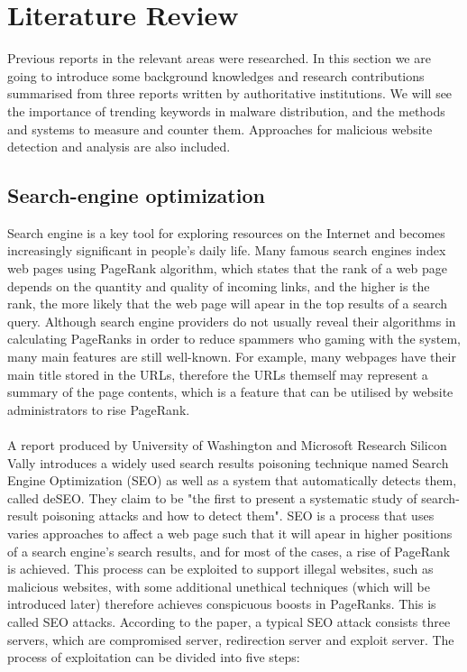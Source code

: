 \section{Literature Review}

Previous reports in the relevant areas were researched. In this section we are
going to introduce some background knowledges and research contributions
summarised from three reports written by authoritative institutions. We will
see the importance of trending keywords in malware distribution, and the
methods and systems to measure and counter them. Approaches for malicious
website detection and analysis are also included. 

\subsection{Search-engine optimization} 

Search engine is a key tool for
exploring resources on the Internet and becomes increasingly significant in
people's daily life. Many famous search engines index web pages using PageRank
algorithm, which states that the rank of a web page depends on the quantity and
quality of incoming links, and the higher is the rank, the more likely that the
web page will apear in the top results of a search query. Although search
engine providers do not usually reveal their algorithms in calculating
PageRanks in order to reduce spammers who gaming with the system, many main
features are still well-known. For example, many webpages have their main title
stored in the URLs, therefore the URLs themself may represent a summary of the
page contents, which is a feature that can be utilised by website administrators 
to rise PageRank.
\paragraph{}
A report produced by University of Washington and Microsoft
Research Silicon Vally introduces a widely used search results poisoning
technique named Search Engine Optimization (SEO) as well as a system that
automatically detects them, called deSEO.\cite{deseo} They claim to be "the
first to present a systematic study of search-result poisoning attacks and how
to detect them". SEO is a process that uses varies approaches to affect a web
page such that it will apear in higher positions of a search engine's search
results, and for most of the cases, a rise of PageRank is achieved. This
process can be exploited to support illegal websites, such as malicious
websites, with some additional unethical techniques (which will be introduced
later) therefore achieves conspicuous boosts in PageRanks. This is called SEO
attacks. According to the paper, a typical SEO attack consists three servers,
which are compromised server, redirection server and exploit server. The
process of exploitation can be divided into five steps: 
